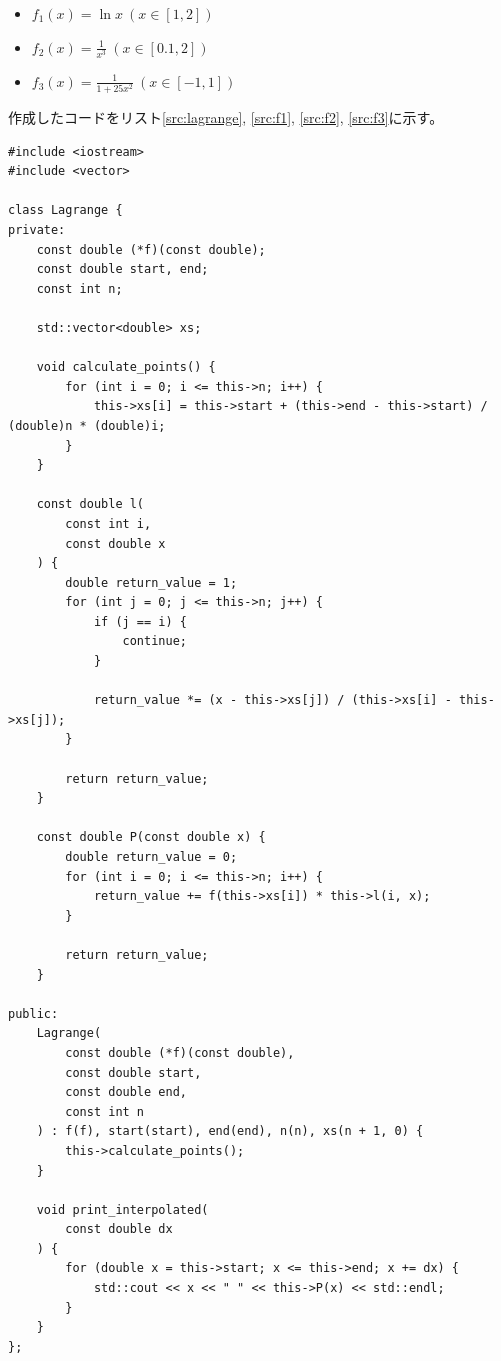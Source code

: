 \documentclass[a4j, titlepage]{jsarticle}
\numberwithin{equation}{section}
\begin{document}
            \begin{itemize}
                \item $f_1(x) = \ln x \ (x \in [1, 2])$
                \item $f_2(x) = \displaystyle\frac{1}{x^3} \ (x \in [0.1, 2])$
                \item $f_3(x) = \displaystyle\frac{1}{1+25x^2} \ (x \in [-1, 1])$
            \end{itemize}

            作成したコードをリスト\ref{src:lagrange}, \ref{src:f1}, \ref{src:f2}, \ref{src:f3}に示す。

            \begin{lstlisting}[caption=式(\ref{equ:lagrange})の実装, label=src:lagrange]
#include <iostream>
#include <vector>

class Lagrange {
private:
    const double (*f)(const double);
    const double start, end;
    const int n;

    std::vector<double> xs;

    void calculate_points() {
        for (int i = 0; i <= this->n; i++) {
            this->xs[i] = this->start + (this->end - this->start) / (double)n * (double)i;
        }
    }

    const double l(
        const int i,
        const double x
    ) {
        double return_value = 1;
        for (int j = 0; j <= this->n; j++) {
            if (j == i) {
                continue;
            }

            return_value *= (x - this->xs[j]) / (this->xs[i] - this->xs[j]);
        }

        return return_value;
    }

    const double P(const double x) {
        double return_value = 0;
        for (int i = 0; i <= this->n; i++) {
            return_value += f(this->xs[i]) * this->l(i, x);
        }

        return return_value;
    }

public:
    Lagrange(
        const double (*f)(const double),
        const double start,
        const double end,
        const int n
    ) : f(f), start(start), end(end), n(n), xs(n + 1, 0) {
        this->calculate_points();
    }

    void print_interpolated(
        const double dx
    ) {
        for (double x = this->start; x <= this->end; x += dx) {
            std::cout << x << " " << this->P(x) << std::endl;
        }
    }
};
            \end{lstlisting}
\end{document}
